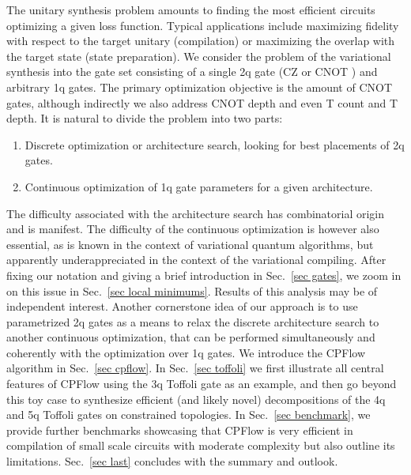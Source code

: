\documentclass[twocolumn, amsfonts, amssymb, aps, nofootinbib]{revtex4-2}
\newcommand{\CZ}{\textsf{CZ }}
\newcommand{\CX}{\textsf{CNOT }}
\newcommand{\T}{\textsf{T }}
\newcommand{\package}[1]{\textrm {#1 }}
\newcommand{\cpflow}{\package{CPFlow}}
\begin{document}
The unitary synthesis problem amounts to finding the most efficient circuits optimizing a given loss function. Typical applications include maximizing fidelity with respect to the target unitary (compilation) or maximizing the overlap with the target state (state preparation). We consider the problem of the variational synthesis into the gate set consisting of a single 2q gate (\CZ or \CX) and arbitrary 1q gates. The primary optimization objective is the amount of \CX gates, although indirectly we also address \CX depth and even \T count and \T depth. It is natural to divide the problem into two parts:
\begin{enumerate}[label=(\roman*), nosep]
	\item Discrete optimization or architecture search, looking for best placements of 2q gates.
	\item Continuous optimization of 1q gate parameters for a given architecture.
\end{enumerate}
The difficulty associated with the architecture search has combinatorial origin and is manifest. The difficulty of the continuous optimization is however also essential, as is known in the context of variational quantum algorithms, but apparently underappreciated in the context of the variational compiling. After fixing our notation and giving a brief introduction in Sec.~\ref{sec gates}, we zoom in on this issue in Sec.~\ref{sec local minimums}. Results of this analysis may be of independent interest. Another cornerstone idea of our approach is to use parametrized 2q gates as a means to relax the discrete architecture search to another continuous optimization, that can be performed simultaneously and coherently with the optimization over 1q gates. We introduce the \cpflow algorithm in Sec.~\ref{sec cpflow}. In Sec.~\ref{sec toffoli} we first illustrate all central features of \cpflow using the 3q Toffoli gate as an example, and then go beyond this toy case to synthesize efficient (and likely novel) decompositions of the 4q and 5q Toffoli gates on constrained topologies. In Sec.~\ref{sec benchmark}, we provide further benchmarks showcasing that \cpflow is very efficient in compilation of small scale circuits with moderate complexity but also outline its limitations. Sec.~\ref{sec last} concludes with the summary and outlook.
\end{document}
